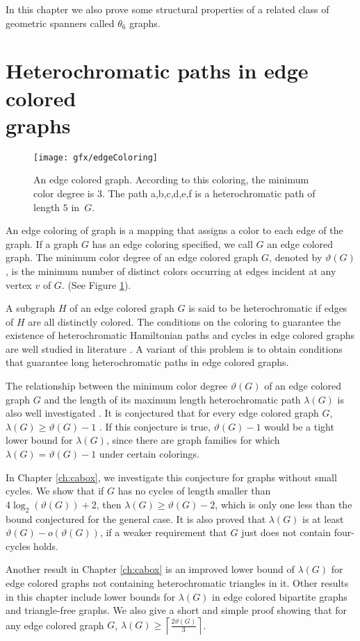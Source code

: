 In this chapter we also prove some structural properties of a related class of geometric spanners called $\theta_6$ graphs. 
\section[Heterochromatic paths in edge colored graphs]{Heterochromatic paths in edge colored\\graphs}
\begin{figure}[b]
\centering
  \texttt{[image: gfx/edgeColoring]}   %
  \caption{An edge colored graph. According to this coloring, the minimum color degree is $3$. The path a,b,c,d,e,f is a heterochromatic path of length $5$ in~$G$.}
\label{FigedgeColoring}
  \end{figure}
An edge coloring of graph is a mapping that assigns a color to each edge of the graph. If a graph $G$ has an edge coloring specified, 
we call $G$ an edge colored graph. The minimum color degree of an edge colored graph $G$, denoted by $\vartheta(G)$, is the minimum number of 
distinct colors occurring at edges incident at any vertex $v$ of $G$. (See Figure \ref{FigedgeColoring}). 

A subgraph $H$ of an edge colored graph $G$ is said to be heterochromatic if edges of $H$ are all distinctly colored. 
The conditions on the coloring to guarantee the existence of heterochromatic Hamiltonian paths and cycles in edge colored graphs are well 
studied in literature \cite{Hahn86,ErdosNesetril93,Albert95,ErdosTuza}. 
A variant of this problem is to obtain conditions that guarantee long heterochromatic paths in edge colored graphs.

The relationship between the minimum color degree $\vartheta(G)$ of an edge colored graph $G$ 
and the length of its maximum length heterochromatic path $\lambda(G)$ is also well investigated \cite{Broersma05,ChenLi2005,ChenL08,AnitaEuroComb}. 
It is conjectured that for every edge colored graph $G$, $\lambda(G) \ge \vartheta(G)-1$ \cite{ChenLi2005}. 
If this conjecture is true, $\vartheta(G)-1$ would be a tight lower bound for $\lambda(G)$, 
since there are graph families for which $\lambda(G)=\vartheta(G)-1$ under certain colorings. 

In Chapter \ref{ch:cabox}, we investigate this conjecture for graphs without small cycles. 
We show that if $G$ has no cycles of length smaller than $4\log_2 (\vartheta(G))+2$, 
then $\lambda(G) \ge \vartheta(G) - 2$, which is only one less than the bound conjectured for the general case. 
It is also proved that $\lambda(G)$ is at least $\vartheta(G) - o(\vartheta(G))$, 
if a weaker requirement that $G$ just does not contain four-cycles holds.

Another result in Chapter \ref{ch:cabox} is an improved lower bound of $\lambda(G)$ 
for edge colored graphs not containing heterochromatic triangles in it.
Other results in this chapter include lower bounds for $\lambda(G)$ in edge colored bipartite graphs and 
triangle-free graphs.
We also give a short and simple proof showing that for any edge colored graph $G$, 
$\lambda(G) \ge \left\lceil\frac{2\vartheta(G)}{3}\right\rceil$. 
